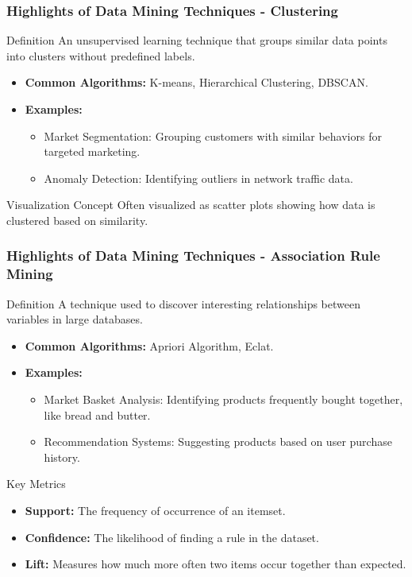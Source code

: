 \documentclass[aspectratio=169]{beamer}
\begin{document}
\begin{frame}[fragile]
    \frametitle{Highlights of Data Mining Techniques - Clustering}
    \begin{block}{Definition}
        An unsupervised learning technique that groups similar data points into clusters without predefined labels.
    \end{block}
    \begin{itemize}
        \item \textbf{Common Algorithms:} K-means, Hierarchical Clustering, DBSCAN.
        \item \textbf{Examples:}
        \begin{itemize}
            \item Market Segmentation: Grouping customers with similar behaviors for targeted marketing.
            \item Anomaly Detection: Identifying outliers in network traffic data.
        \end{itemize}
    \end{itemize}
    \begin{block}{Visualization Concept}
        Often visualized as scatter plots showing how data is clustered based on similarity.
    \end{block}
\end{frame}

\begin{frame}[fragile]
    \frametitle{Highlights of Data Mining Techniques - Association Rule Mining}
    \begin{block}{Definition}
        A technique used to discover interesting relationships between variables in large databases.
    \end{block}
    \begin{itemize}
        \item \textbf{Common Algorithms:} Apriori Algorithm, Eclat.
        \item \textbf{Examples:}
        \begin{itemize}
            \item Market Basket Analysis: Identifying products frequently bought together, like bread and butter.
            \item Recommendation Systems: Suggesting products based on user purchase history.
        \end{itemize}
    \end{itemize}
    \begin{block}{Key Metrics}
        \begin{itemize}
            \item \textbf{Support:} The frequency of occurrence of an itemset.
            \item \textbf{Confidence:} The likelihood of finding a rule in the dataset.
            \item \textbf{Lift:} Measures how much more often two items occur together than expected.
        \end{itemize}
    \end{block}
\end{frame}
\end{document}
